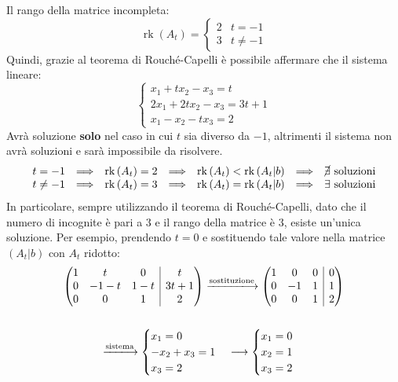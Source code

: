 \documentclass[a4paper]{article}
\makeatletter
\DeclareMathOperator{\rk}{rk}
\newenvironment{rowequmat}[1]{\left(\array{@{}#1@{}}}{\endarray\right)}
\makeatother
\begin{document}
	Il rango della matrice incompleta:
	\begin{equation*}
		\rk\left(A_{t}\right) = \begin{cases}
			2 & t = -1 \\
			3 & t \ne -1
		\end{cases}
	\end{equation*}
	Quindi, grazie al teorema di Rouché-Capelli è possibile affermare che il sistema lineare:
	\begin{equation*}
		\begin{cases}
			x_{1} + tx_{2} - x_{3} = t \\
			2x_{1} + 2tx_{2} - x_{3} = 3t+1 \\
			x_{1} - x_{2} - tx_{3} = 2
		\end{cases}
	\end{equation*}
	Avrà soluzione \textbf{solo} nel caso in cui $t$ sia diverso da $-1$, altrimenti il sistema non avrà soluzioni e sarà impossibile da risolvere.
	\begin{equation*}
		\begin{array}{lllllll}
			t = -1 	& \Longrightarrow & \rk\left(A_{t}\right) = 2 & \Longrightarrow & \rk\left(A_{t}\right) < \rk\left(A_{t}|b\right) & \Longrightarrow & \cancel{\exists} \text{ soluzioni} \\
			t \ne -1& \Longrightarrow & \rk\left(A_{t}\right) = 3 & \Longrightarrow & \rk\left(A_{t}\right) = \rk\left(A_{t}|b\right) & \Longrightarrow & \exists \text{ soluzioni} \\
		\end{array}
	\end{equation*}
	In particolare, sempre utilizzando il teorema di Rouché-Capelli, dato che il numero di incognite è pari a $3$ e il rango della matrice è $3$, esiste un'unica soluzione. Per esempio, prendendo $t = 0$ e sostituendo tale valore nella matrice $\left(A_{t}|b\right)$ con $A_{t}$ ridotto:
	\begin{gather*}
		\begin{rowequmat}{ccc|c}
			1 & t & 0 & t \\
			0 & -1-t & 1-t & 3t+1 \\
			0 & 0 &  1 & 2
		\end{rowequmat} \xlongrightarrow{\text{sostituzione}}
		\begin{rowequmat}{ccc|c}
			1 & 0 & 0 & 0 \\
			0 & -1 & 1 & 1 \\
			0 & 0 &  1 & 2
		\end{rowequmat} \\
		\\
		\xlongrightarrow{\text{sistema}}
		\begin{cases}
			x_{1} = 0 \\
			-x_{2} + x_{3} = 1 \\
			x_{3} = 2
		\end{cases} \longrightarrow
		\begin{cases}
			x_{1} = 0 \\
			x_{2} = 1\\
			x_{3} = 2
		\end{cases}
	\end{gather*}
\end{document}
